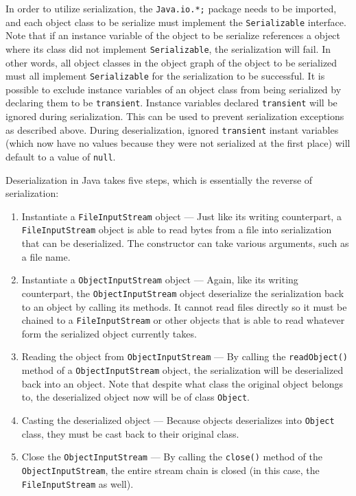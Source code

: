 \documentclass{tufte-handout}
\begin{document}
    In order to utilize serialization, the \texttt{Java.io.*;} package needs to be imported, and each object class to be serialize must implement the \texttt{Serializable} interface. Note that if an instance variable of the object to be serialize references a object where its class did not implement \texttt{Serializable}, the serialization will fail. In other words, all object classes in the object graph of the object to be serialized must all implement \texttt{Serializable} for the serialization to be successful. It is possible to exclude instance variables of an object class from being serialized by declaring them to be \texttt{transient}. Instance variables declared \texttt{transient} will be ignored during serialization. This can be used to prevent serialization exceptions as described above. During deserialization, ignored \texttt{transient} instant variables (which now have no values because they were not serialized at the first place) will default to a value of \texttt{null}. 

    Deserialization in Java takes five steps, which is essentially the reverse of serialization:

    \begin{enumerate}
         \item Instantiate a \texttt{FileInputStream} object --- Just like its writing counterpart, a \texttt{FileInputStream} object is able to read bytes from a file into serialization that can be deserialized. The constructor can take various arguments, such as a file name.
         \item Instantiate a \texttt{ObjectInputStream} object --- Again, like its writing counterpart, the \texttt{ObjectInputStream} object deserialize the serialization back to an object by calling its methods. It cannot read files directly so it must be chained to a \texttt{FileInputStream} or other objects that is able to read whatever form the serialized object currently takes.
         \item Reading the object from \texttt{ObjectInputStream} --- By calling the \texttt{readObject()} method of a \texttt{ObjectInputStream} object, the serialization will be deserialized back into an object. Note that despite what class the original object belongs to, the deserialized object now will be of class \texttt{Object}.
         \item Casting the deserialized object --- Because objects deserializes into \texttt{Object} class, they must be cast back to their original class.
         \item Close the \texttt{ObjectInputStream} --- By calling the \texttt{close()} method of the \texttt{ObjectInputStream}, the entire stream chain is closed (in this case, the \texttt{FileInputStream} as well).
    \end{enumerate} 
\end{document}
